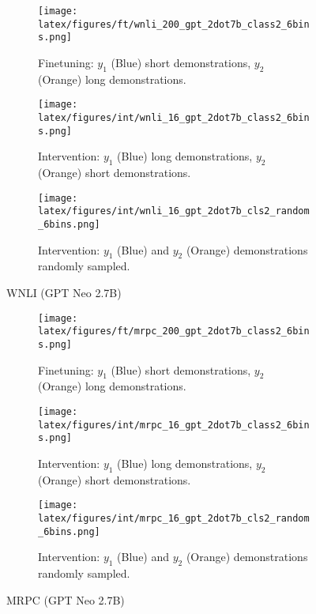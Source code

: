 \begin{figure*}[t!]
    \centering
    \begin{minipage}[t]{\linewidth}
        \begin{subfigure}{0.31\linewidth}
            \centering
            \texttt{[image: latex/figures/ft/wnli\_200\_gpt\_2dot7b\_class2\_6bins.png]}
            \caption{Finetuning: $y_1$ (Blue) short demonstrations, $y_2$ (Orange) long demonstrations.}
        \end{subfigure}%
        \hfill
        \begin{subfigure}{0.31\linewidth}
            \centering
            \texttt{[image: latex/figures/int/wnli\_16\_gpt\_2dot7b\_class2\_6bins.png]}
            \caption{Intervention: $y_1$ (Blue) long demonstrations, $y_2$ (Orange) short demonstrations.}
        \end{subfigure}
        \hfill
        \begin{subfigure}{0.31\linewidth}
            \centering
            \texttt{[image: latex/figures/int/wnli\_16\_gpt\_2dot7b\_cls2\_random\_6bins.png]}
            \caption{Intervention: $y_1$ (Blue) and $y_2$ (Orange) demonstrations randomly sampled.}
        \end{subfigure}
    \end{minipage}%
    \hfill
    \begin{minipage}[c]{\linewidth}
        \caption{WNLI (GPT Neo 2.7B)}
    \end{minipage}
\end{figure*}

\begin{figure*}[t!]
    \centering
    \begin{minipage}[t]{\linewidth}
        \begin{subfigure}{0.31\linewidth}
            \centering
            \texttt{[image: latex/figures/ft/mrpc\_200\_gpt\_2dot7b\_class2\_6bins.png]}
            \caption{Finetuning: $y_1$ (Blue) short demonstrations, $y_2$ (Orange) long demonstrations.}
        \end{subfigure}%
        \hfill
        \begin{subfigure}{0.31\linewidth}
            \centering
            \texttt{[image: latex/figures/int/mrpc\_16\_gpt\_2dot7b\_class2\_6bins.png]}
            \caption{Intervention: $y_1$ (Blue) long demonstrations, $y_2$ (Orange) short demonstrations.}
        \end{subfigure}
        \hfill
        \begin{subfigure}{0.31\linewidth}
            \centering
            \texttt{[image: latex/figures/int/mrpc\_16\_gpt\_2dot7b\_cls2\_random\_6bins.png]}
            \caption{Intervention: $y_1$ (Blue) and $y_2$ (Orange) demonstrations randomly sampled.}
        \end{subfigure}
    \end{minipage}%
    \hfill
    \begin{minipage}[c]{\linewidth}
        \caption{MRPC (GPT Neo 2.7B)}
    \end{minipage}
\end{figure*}

